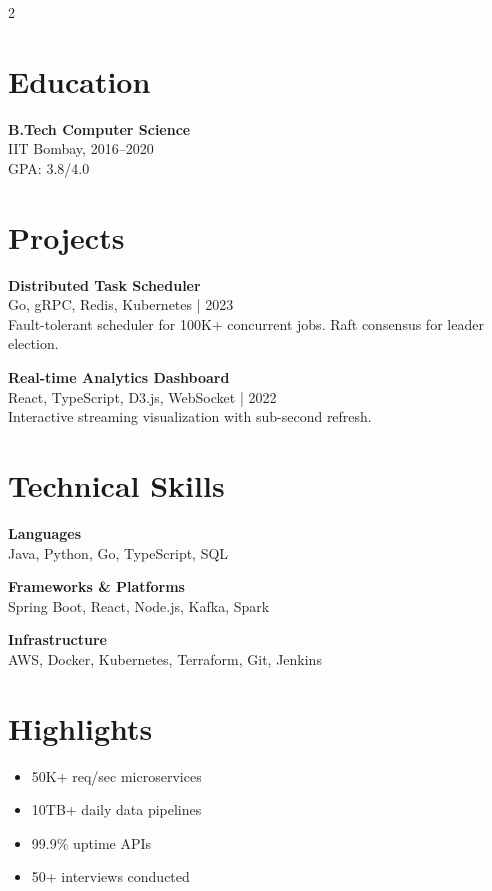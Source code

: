 \documentclass[10pt,a4paper]{article}
\begin{document}
\begin{multicols}{2}

\section{Education}
{\bfseries B.Tech Computer Science}\\
{\small IIT Bombay, 2016--2020}\\
{\small GPA: 3.8/4.0}

\section{Projects}
{\bfseries\small Distributed Task Scheduler}\\
{\scriptsize Go, gRPC, Redis, Kubernetes | 2023}\\
{\small Fault-tolerant scheduler for 100K+ concurrent jobs. Raft consensus for leader election.}
\vspace{4pt}

{\bfseries\small Real-time Analytics Dashboard}\\
{\scriptsize React, TypeScript, D3.js, WebSocket | 2022}\\
{\small Interactive streaming visualization with sub-second refresh.}

\columnbreak

\section{Technical Skills}

{\small\bfseries Languages}\\
{\small Java, Python, Go, TypeScript, SQL}
\vspace{4pt}

{\small\bfseries Frameworks \& Platforms}\\
{\small Spring Boot, React, Node.js, Kafka, Spark}
\vspace{4pt}

{\small\bfseries Infrastructure}\\
{\small AWS, Docker, Kubernetes, Terraform, Git, Jenkins}
\vspace{4pt}

\section{Highlights}
\begin{itemize}[leftmargin=1em, itemsep=0pt, topsep=0pt, label={\color{accentcolor}$\triangleright$}]
\item \small 50K+ req/sec microservices
\item \small 10TB+ daily data pipelines
\item \small 99.9\% uptime APIs
\item \small 50+ interviews conducted
\end{itemize}

\end{multicols}
\end{document}
